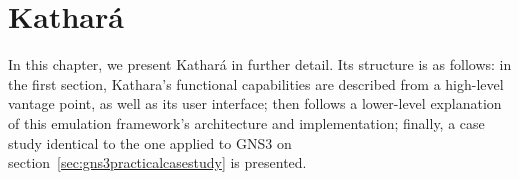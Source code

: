 
\chapter{Kathará}
\label{ch:kathara}

In this chapter, we present Kathará in further detail.
Its structure is as follows: in the first section, Kathara's functional capabilities are described from a high-level vantage point, as well as its user interface; then follows a lower-level explanation of this emulation framework's architecture and implementation; finally, a case study identical to the one applied to GNS3 on section~\ref{sec:gns3practicalcasestudy} is presented.












